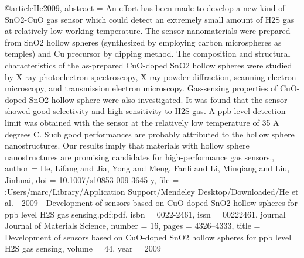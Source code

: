 @article{He2009,
abstract = {An effort has been made to develop a new kind of SnO2-CuO gas sensor which could detect an extremely small amount of H2S gas at relatively low working temperature. The sensor nanomaterials were prepared from SnO2 hollow spheres (synthesized by employing carbon microspheres as temples) and Cu precursor by dipping method. The composition and structural characteristics of the as-prepared CuO-doped SnO2 hollow spheres were studied by X-ray photoelectron spectroscopy, X-ray powder diffraction, scanning electron microscopy, and transmission electron microscopy. Gas-sensing properties of CuO-doped SnO2 hollow sphere were also investigated. It was found that the sensor showed good selectivity and high sensitivity to H2S gas. A ppb level detection limit was obtained with the sensor at the relatively low temperature of 35 A degrees C. Such good performances are probably attributed to the hollow sphere nanostructures. Our results imply that materials with hollow sphere nanostructures are promising candidates for high-performance gas sensors.},
author = {He, Lifang and Jia, Yong and Meng, Fanli and Li, Minqiang and Liu, Jinhuai},
doi = {10.1007/s10853-009-3645-y},
file = {:Users/marc/Library/Application Support/Mendeley Desktop/Downloaded/He et al. - 2009 - Development of sensors based on CuO-doped SnO2 hollow spheres for ppb level H2S gas sensing.pdf:pdf},
isbn = {0022-2461},
issn = {00222461},
journal = {Journal of Materials Science},
number = {16},
pages = {4326--4333},
title = {{Development of sensors based on CuO-doped SnO2 hollow spheres for ppb level H2S gas sensing}},
volume = {44},
year = {2009}
}
